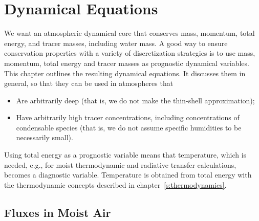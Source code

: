 \documentclass{report}
\begin{document}
\chapter{Dynamical Equations}
\label{sec:governing_equations}

We want an atmospheric dynamical core that conserves mass, momentum, total energy, and tracer masses, including water mass. A good way to ensure conservation properties with a variety of discretization strategies is to use mass, momentum, total energy and tracer masses as prognostic dynamical variables. This chapter outlines the resulting dynamical equations. It discusses them in general, so that they can be used in atmospheres that 
\begin{itemize}
\item Are arbitrarily deep (that is, we do not make the thin-shell approximation);
\item Have arbitrarily high tracer concentrations, including concentrations of condensable species (that is, we do not assume specific humidities to be necessarily small).
\end{itemize}
Using total energy as a prognostic variable means that temperature, which is needed, e.g., for moist thermodynamic and radiative transfer calculations, becomes a diagnostic variable. Temperature is obtained from total energy with the thermodynamic concepts described in chapter~\ref{s:thermodynamics}.

\section{Fluxes in Moist Air}
\end{document}
